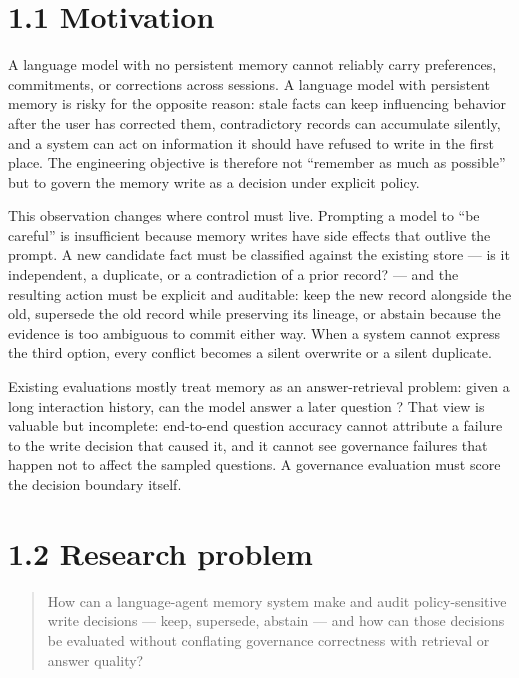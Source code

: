 \section{1.1 Motivation}\label{motivation}

A language model with no persistent memory cannot reliably carry
preferences, commitments, or corrections across sessions. A language
model with persistent memory is risky for the opposite reason: stale
facts can keep influencing behavior after the user has corrected them,
contradictory records can accumulate silently, and a system can act on
information it should have refused to write in the first place. The
engineering objective is therefore not ``remember as much as possible''
but to govern the memory write as a decision under explicit policy.

This observation changes where control must live. Prompting a model to
``be careful'' is insufficient because memory writes have side effects
that outlive the prompt. A new candidate fact must be classified against
the existing store --- is it independent, a duplicate, or a
contradiction of a prior record? --- and the resulting action must be
explicit and auditable: keep the new record alongside the old, supersede
the old record while preserving its lineage, or abstain because the
evidence is too ambiguous to commit either way. When a system cannot
express the third option, every conflict becomes a silent overwrite or a
silent duplicate.

Existing evaluations mostly treat memory as an answer-retrieval problem:
given a long interaction history, can the model answer a later question
\citep{wu2025longmemeval, maharana2024locomo}? That view is valuable but
incomplete: end-to-end question accuracy cannot attribute a failure to
the write decision that caused it, and it cannot see governance failures
that happen not to affect the sampled questions. A governance evaluation
must score the decision boundary itself.

\section{1.2 Research problem}\label{research-problem}

\begin{quote}
How can a language-agent memory system make and audit policy-sensitive
write decisions --- keep, supersede, abstain --- and how can those
decisions be evaluated without conflating governance correctness with
retrieval or answer quality?
\end{quote}

